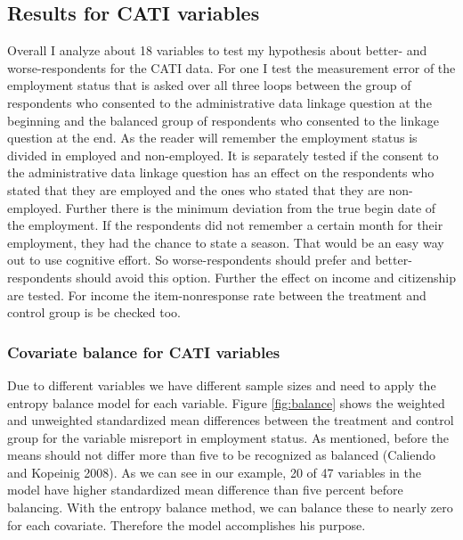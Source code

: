\subsection{Results for CATI variables}

Overall I analyze about 18 variables to test my hypothesis about better- and worse-respondents for the CATI data.  For one I test the measurement error of the employment status that is asked over all three loops between the group of respondents who consented to the administrative data linkage question at the beginning and the balanced group of respondents who consented to the linkage question at the end. As the reader will remember the employment status is divided in employed and non-employed. It is separately tested if the consent to the administrative data linkage question has an effect on the respondents who stated that they are employed and the ones who stated that they are non-employed. Further there is the minimum deviation from the true begin date of the employment. If the respondents did not remember a certain month for their employment, they had the chance to state a season. That would be an easy way out to use cognitive effort. So worse-respondents should prefer and better-respondents should avoid this option. Further the effect on income and citizenship are tested. For income the item-nonresponse rate between the treatment and control group is be checked too.


\subsubsection{Covariate balance for CATI variables}

Due to different variables we have different sample sizes and need to apply the entropy balance model for each variable. Figure \ref{fig:balance} shows the weighted and unweighted standardized mean differences between the treatment and control group for the variable misreport in employment status. As mentioned, before the means should not differ more than five to be recognized as balanced (Caliendo and Kopeinig 2008). As we can see in our example, 20 of 47 variables in the model have higher standardized mean difference than five percent before balancing. With the entropy balance method, we can balance these to nearly zero for each covariate. Therefore the model accomplishes his purpose. 


